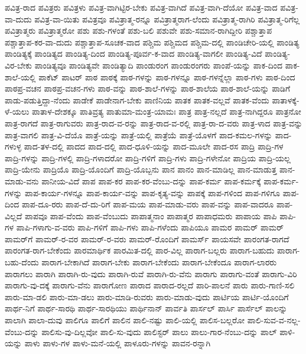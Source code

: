 {ಪವಿತ್ರ-ರಾದ
ಪವಿತ್ರರು
ಪವಿತ್ರಳು
ಪವಿತ್ರ-ವಾಗಿಟ್ಟಿರ-ಬೇಕು
ಪವಿತ್ರ-ವಾಗಿದೆ
ಪವಿತ್ರ-ವಾಗಿ-ದೆಯೋ
ಪವಿತ್ರ-ವಾದ
ಪವಿತ್ರ-ವಾ-ದುದು
ಪವಿತ್ರ-ವಾ-ಯಿತು
ಪವಿತ್ರವೂ
ಪವಿತ್ರಾತ್ಮ-ರನ್ನೂ
ಪವಿತ್ರಾತ್ಮರಾಗ-ಲೆಂದು
ಪವಿತ್ರಾತ್ಮ-ರಾಗಿರಿ
ಪವಿತ್ರಾತ್ಮ-ರಿಗೆಲ್ಲ
ಪವಿತ್ರಾತ್ಮರು
ಪವಿತ್ರಾತ್ಮರೋ
ಪಶು
ಪಶು-ಗಳಂತೆ
ಪಶು-ಬಲಿ
ಪಶುವೇ
ಪಶು-ಸಮಾನ-ರಾಗಿದ್ದೀರಿ
ಪಶ್ಚಾತ್ತಾಪ
ಪಶ್ಚಾತ್ತಾಪ-ಕರ-ವಾ-ದುದು
ಪಶ್ಚಾತ್ತಾಪ-ಸೂಚಕ-ವಾದ
ಪಶ್ಚಿಮ
ಪಶ್ಚಿಮದ
ಪಶ್ಚಿಮ-ದಲ್ಲಿ
ಪಾಂಡಿಚೇರಿ-ಯಲ್ಲಿ
ಪಾಂಡಿತ್ಯ
ಪಾಂಡಿತ್ಯಕ್ಕೆ
ಪಾಂಡಿತ್ಯದ
ಪಾಂಡಿತ್ಯ-ದಿಂದ
ಪಾಂಡಿತ್ಯ-ಪೂರ್ವ-ಕ-ವಾದ
ಪಾಂಡಿತ್ಯ-ವಾಗಲೀ
ಪಾಂಡಿತ್ಯ-ವಿದೆ
ಪಾಂಡಿತ್ಯ-ವಿರ-ಬೇಕು
ಪಾಂಡಿತ್ಯವೂ
ಪಾಂಡಿತ್ಯವೇ
ಪಾಂಡಿತ್ಯಾದಿ
ಪಾಂಡುರಂಗ
ಪಾಂಡುರಂಗರು
ಪಾಂಪೆ-ಯನ್ನು
ಪಾಕ-ದಿಂದ
ಪಾಕ-ಶಾಲೆ-ಯಲ್ಲಿ
ಪಾಕೆಟ್
ಪಾಟರ್
ಪಾಠ
ಪಾಠಕ್ಕೆ
ಪಾಠ-ಗಳನ್ನು
ಪಾಠ-ಗಳನ್ನೂ
ಪಾಠ-ಗಳನ್ನೆಲ್ಲಾ
ಪಾಠ-ಗಳು
ಪಾಠ-ದಿಂದ
ಪಾಠಪ್ರ-ವಚನ
ಪಾಠಪ್ರ-ವಚನ-ಗಳು
ಪಾಠ-ವನ್ನು
ಪಾಠ-ಶಾಲೆ-ಗಳನ್ನು
ಪಾಠ-ಶಾಲೆಯ
ಪಾಠ-ಶಾಲೆ-ಯನ್ನು
ಪಾಡಿಗೆ
ಪಾಡು-ಪಡುತ್ತಿದ್ದಾ-ನೆಂದು
ಪಾಡೇಕೆ
ಪಾಡೇನಾಗ-ಬೇಕು
ಪಾಣಿನಿಯ
ಪಾತಕ
ಪಾತಕ-ವಲ್ಲವೆ
ಪಾತಕ-ವೆಂದು
ಪಾತಾಳಕ್ಕೆ-ಳೆ-ಯಲು
ಪಾತಾಳ-ದೇಶಕ್ಕೂ
ಪಾತಿವ್ರತ್ಯ
ಪಾತುಮಾ-ಮಂತ್ರ-ಯಾಮಃ
ಪಾತ್ರ
ಪಾತ್ರ-ನಲ್ಲದೆ
ಪಾತ್ರ-ನಾಗಿದ್ದರೂ
ಪಾತ್ರನೋ
ಪಾತ್ರ-ರಾಗದೆ
ಪಾತ್ರ-ರಾಗುವರು
ಪಾತ್ರ-ರಾದ-ವ-ರನ್ನು
ಪಾತ್ರ-ರಾದ-ವ-ರಲ್ಲಿ
ಪಾತ್ರ-ರಾ-ದ-ವರು
ಪಾತ್ರ-ಳಾದ
ಪಾತ್ರ-ವನ್ನು
ಪಾತ್ರ-ವಾಗಲಿ
ಪಾತ್ರ-ವಿ-ದೆಯೊ
ಪಾತ್ರೆ-ಯನ್ನು
ಪಾತ್ರೆ-ಯಲ್ಲಿ
ಪಾತ್ರೆಯೆ
ಪಾತ್ರೆ-ಯೊಳಗೆ
ಪಾದ-ಕಮಲ-ಗಳನ್ನು
ಪಾದ-ಗಳುಳ್ಳ
ಪಾದ-ತಳ-ದಲ್ಲಿ
ಪಾದದ
ಪಾದ-ದಲ್ಲಿ
ಪಾದ-ಧೂಳಿ-ಯನ್ನು
ಪಾದ-ಮೂಲೇ
ಪಾದ-ರಸ
ಪಾದ್ರಿ
ಪಾದ್ರಿ-ಗಳ
ಪಾದ್ರಿ-ಗಳನ್ನು
ಪಾದ್ರಿ-ಗಳಲ್ಲಿ
ಪಾದ್ರಿ-ಗಳಾದರೋ
ಪಾದ್ರಿ-ಗಳಿಗೆ
ಪಾದ್ರಿ-ಗಳು
ಪಾದ್ರಿ-ಗಳೇನೋ
ಪಾದ್ರಿಯ
ಪಾದ್ರಿ-ಯಲ್ಲ
ಪಾದ್ರಿ-ಯೇನು
ಪಾದ್ರಿಯೊ
ಪಾದ್ರಿ-ಯೊಂದಿಗೆ
ಪಾದ್ರಿ-ಯೊಬ್ಬನು
ಪಾನ
ಪಾನಂ
ಪಾನ-ಮಾಡಿಲ್ಲ
ಪಾನ-ಮಾಡುತ್ತ
ಪಾನ-ಮಾಡು-ವನು
ಪಾನೀಯ-ವಿದೆ
ಪಾಪ
ಪಾಪ-ಕರ
ಪಾಪ-ಕರ-ವೆಂಬು-ದನ್ನು
ಪಾಪ-ಕರ್ಮ
ಪಾಪ-ಕರ್ಮಕ್ಕೆ
ಪಾಪ-ಕರ್ಮ-ಗಳನ್ನು
ಪಾಪ-ಕಾರ್ಯ-ಗಳನ್ನೂ
ಪಾಪ-ಕಾರ್ಯ-ವನ್ನು
ಪಾಪ-ಕೃತ್ಯ-ವನ್ನು
ಪಾಪಕ್ಕೆ
ಪಾಪ-ಗಳಿಂದ
ಪಾಪ-ಗಳಿಗೂ
ಪಾಪ-ದಿಂದ
ಪಾಪ-ದೂ-ರರು
ಪಾಪ-ದೆ-ದು-ರಿಗೆ
ಪಾಪ-ಮಯ
ಪಾಪ-ಮಾಡು-ವರು
ಪಾಪ-ವನ್ನು
ಪಾಪ-ವಾದರೂ
ಪಾಪ-ವಿಲ್ಲದೆ
ಪಾಪವೂ
ಪಾಪ-ವೆಂದು
ಪಾಪ-ವೆಂಬುದು
ಪಾಪಾತ್ಮನಾಂ
ಪಾಪಾತ್ಮರ
ಪಾಪಾಧಮರು
ಪಾಪಾಯ
ಪಾಪಿ
ಪಾಪಿ-ಗಳ
ಪಾಪಿ-ಗಳಾಗು-ವ-ವರು
ಪಾಪಿ-ಗಳಿಗೆ
ಪಾಪಿ-ಗಳು
ಪಾಪಿ-ಗಳೆಂದು
ಪಾಪಿಯೂ
ಪಾಮರ
ಪಾಮರ್
ಪಾಮರ್‌
ಪಾಮರ್‌ಗೆ
ಪಾಮರ್‌-ರ-ವರ
ಪಾಮರ್‌-ರ-ವರು
ಪಾಮರ್‌-ರೊಂದಿಗೆ
ಪಾಮ‌ರ್ಸ್
ಪಾಯಸವೇ
ಪಾರಂಗತ-ರಾಗದೆ
ಪಾರಂಗತ-ರಾಗ-ಬೇಕೆಂದು
ಪಾರಮಾರ್ಥಿಕ
ಪಾರಮಿತ-ದಲ್ಲಿ
ಪಾರ-ವಿಲ್ಲ
ಪಾರಾಗ-ಬಲ್ಲರು
ಪಾರಾಗ-ಬಹುದು
ಪಾರಾಗ-ಬಹು-ದೆಂದು
ಪಾರಾಗ-ಬೇಕಾಗಿದೆ
ಪಾರಾಗ-ಬೇಕು
ಪಾರಾಗ-ಬೇಕೆಂದು
ಪಾರಾಗ-ಬೇಕೆಂದೂ
ಪಾರಾಗ-ಲಾರರು
ಪಾರಾಗಲು
ಪಾರಾಗಿ
ಪಾರಾಗಿ-ರು-ವುದು
ಪಾರಾಗಿ-ರುವೆ
ಪಾರಾಗಿ-ರು-ವೆನು
ಪಾರಾಗು
ಪಾರಾಗು-ವಂತೆ
ಪಾರಾಗು-ವಿರಿ
ಪಾರಾಗು-ವು-ದಕ್ಕೆ
ಪಾರಾಗು-ವೆನು
ಪಾರಾಗೋಣ
ಪಾರಾದ
ಪಾರಾದ-ರಲ್ಲದೆ
ಪಾರಿ-ಪಾಲನೆ
ಪಾರು
ಪಾರು-ಗಾಣಿ-ಸಲಿ
ಪಾರು-ಮಾ-ಡಲಿ
ಪಾರು-ಮಾ-ಡಲು
ಪಾರು-ಮಾಡಿ-ರುವರು
ಪಾರು-ಮಾಡು-ವುದು
ಪಾರ್ಟಿಯ
ಪಾರ್ಟಿ-ಯೊಂದಿಗೆ
ಪಾರ್ಥ-ನಿಗೆ
ಪಾರ್ಥ-ಸಾರಥಿ
ಪಾರ್ಥ-ಸಾರಥಿಯು
ಪಾರ್ಥಿನಾನ್
ಪಾರ್ವತಿ
ಪಾರ್ಸಲ್
ಪಾರ್ಸಿ
ಪಾರ್ಸೆಲ್
ಪಾಲನ್ನು
ಪಾಲಾಗಿ
ಪಾಲಾ-ದುವು
ಪಾಲಿಗೂ
ಪಾಲಿಗೆ
ಪಾಲಿನ
ಪಾಲಿ-ನಷ್ಟು
ಪಾಲಿ-ಯಲ್ಲಿ
ಪಾಲಿಸ-ಬಲ್ಲರೋ
ಪಾಲಿ-ಸುವ-ವ-ನಲ್ಲ-ವೆಂಬು-ದನ್ನು
ಪಾಲಿಸು-ವು-ದಿಲ್ಲವೋ
ಪಾಲಿ-ಸು-ವುದು
ಪಾಲಿಸ್ಟರ್
ಪಾಲು
ಪಾಲು-ಗಾರ-ನೆಂಬು-ದನ್ನು
ಪಾಲ್
ಪಾಳಿ-ಯನ್ನು
ಪಾಳು
ಪಾಳು-ಗಳ
ಪಾಳು-ಮನೆ-ಯಲ್ಲಿ
ಪಾಳೂರು-ಗಳನ್ನು
ಪಾವನ-ರನ್ನಾಗಿ
}
